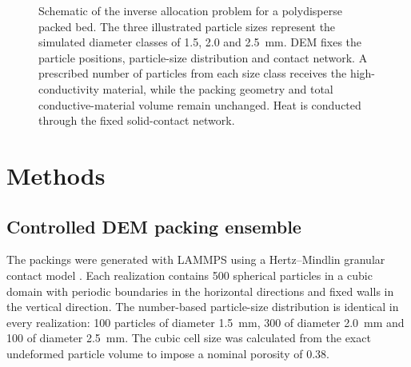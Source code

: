 \documentclass[12pt,a4paper]{article}
\begin{document}
\begin{figure}[!htbp]
{\begin{tikzpicture}
%			
%			
%			
%			
%			
%			
		\end{tikzpicture}%
	}
	
	\caption{Schematic of the inverse allocation problem for a polydisperse packed
		bed. The three illustrated particle sizes represent the simulated diameter
		classes of 1.5, 2.0 and 2.5~mm. DEM fixes the particle positions, particle-size
		distribution and contact network. A prescribed number of particles from each
		size class receives the high-conductivity material, while the packing geometry
		and total conductive-material volume remain unchanged. Heat is conducted
		through the fixed solid-contact network.}
	
	\label{fig:problem}
\end{figure}
	
	\section{Methods}
	
	\subsection{Controlled DEM packing ensemble}
	
	The packings were generated with LAMMPS using a Hertz--Mindlin granular contact
	model \cite{LAMMPSGranular}. Each realization contains 500 spherical particles
	in a cubic domain with periodic boundaries in the horizontal directions and
	fixed walls in the vertical direction. The number-based particle-size
	distribution is identical in every realization: 100 particles of diameter
	1.5~mm, 300 of diameter 2.0~mm and 100 of diameter 2.5~mm. The cubic cell size
	was calculated from the exact undeformed particle volume to impose a nominal
	porosity of 0.38.
	
\end{document}

